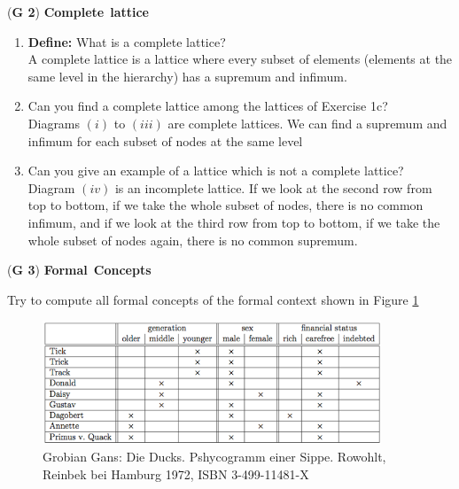 \documentclass{article}
\begin{document}
\left(\textbf{G 2}\right) \textbf{Complete}\ \textbf{lattice}

\begin{enumerate}[label=\alph*)]
  \item \textbf{Define:} What is a complete lattice? \\
    A complete lattice is a lattice where every subset of elements (elements at the same level in the hierarchy) has a supremum and infimum.

  \item Can you find a complete lattice among the lattices of Exercise 1c? \\
    Diagrams $(i)$ to $(iii)$ are complete lattices. We can find a supremum and infimum for each subset of nodes at the same level

  \item Can you give an example of a lattice which is not a complete lattice?\\
    Diagram $(iv)$ is an incomplete lattice. If we look at the second row from top to bottom, if we take the whole subset of nodes, there is no common infimum, and if we look at the third row from top to bottom, if we take the whole subset of nodes again, there is no common supremum.

\end{enumerate}

\left(\textbf{G 3}\right) \textbf{Formal}\ \textbf{Concepts}

Try to compute all formal concepts of the formal context shown in Figure \ref{grobian_gans}


  \begin{figure}[htbp]
    \centering
    \includegraphics[width=0.9\textwidth]{g3_concepts.png}
    \caption{Grobian Gans: Die Ducks. Pshycogramm einer Sippe. Rowohlt, Reinbek bei Hamburg 1972, ISBN 3-499-11481-X}
    \label{grobian_gans}
  \end{figure}
\end{document}
